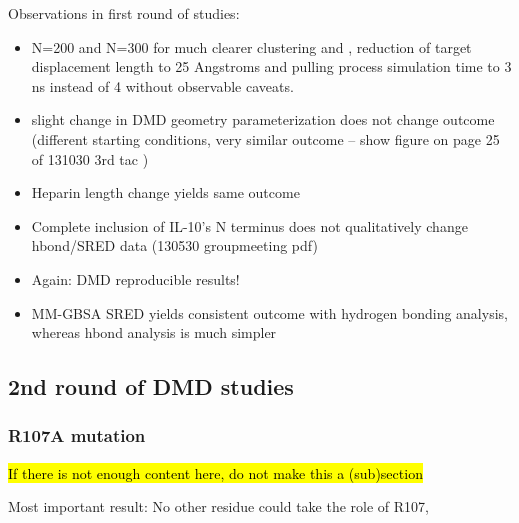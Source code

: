 Observations in first round of studies:

\begin{itemize}

\item N=200 and N=300 for much clearer clustering and , reduction of target displacement length
to 25  Angstroms and pulling process simulation time to 3 ns instead of 4 without
observable caveats.

\item slight change in DMD geometry parameterization does not change outcome (different starting conditions, very similar outcome -- show figure on page 25 of 131030 3rd tac )

\item Heparin length change yields same outcome

\item Complete inclusion of IL-10's N terminus does not qualitatively change hbond/SRED data (130530 groupmeeting pdf)

\item Again: DMD reproducible results!

\item MM-GBSA SRED yields consistent outcome with hydrogen bonding analysis,
whereas hbond analysis is much simpler


\end{itemize}

\subsection{2nd round of DMD studies}

\subsubsection{R107A mutation}

\hl{If there is not enough content here, do not make this a (sub)section}

Most important result: No other residue could take the role of R107,

